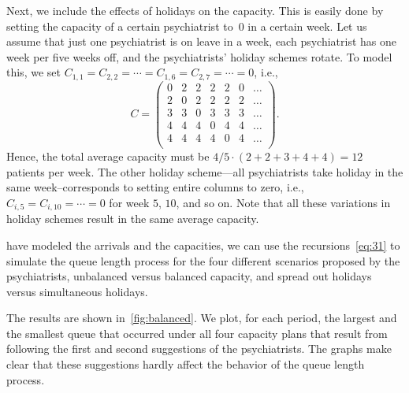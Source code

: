 Next, we include the effects of holidays on the capacity. This is
easily done by setting the capacity of a certain psychiatrist to~$0$ in
a certain week. Let us assume that just one psychiatrist is on leave in
a week, each psychiatrist has one week per five weeks off, and the
psychiatrists' holiday schemes rotate. To model this, we set
$C_{1,1}=C_{2,2}=\cdots=C_{1,6}=C_{2,7} =\cdots = 0$, i.e.,
\begin{equation*}
C = 
 \begin{pmatrix}
 0 & 2 & 2 & 2 & 2 & 0 & \ldots \\
 2 & 0 & 2 & 2 & 2 & 2 & \ldots\\
 3 & 3 & 0 & 3 & 3 & 3 & \ldots\\
 4 & 4 & 4 & 0 & 4 & 4 & \ldots\\
 4 & 4 & 4 & 4 & 0 & 4 & \ldots\\
 \end{pmatrix}.
\end{equation*}
Hence, the total average capacity must be $4/5 \cdot (2+2+3+4+4) = 12$
patients per week. The other holiday scheme---all psychiatrists take
holiday in the same week--corresponds to setting entire columns to
zero, i.e., $C_{i,5}=C_{i,10}=\cdots=0$ for week $5$, $10$, and so
on. Note that all these variations in holiday schemes result in the
same average capacity.

 have modeled the arrivals and the capacities, we can use the recursions~\cref{eq:31} to simulate the queue length process for the four different scenarios proposed by the psychiatrists, unbalanced versus balanced capacity, and spread out holidays versus simultaneous holidays.

The results are shown in~\cref{fig:balanced}.
We plot, for each period, the largest and the smallest queue that occurred under all four capacity plans that result from following the first and second suggestions of the psychiatrists.
The graphs make clear that these suggestions hardly affect the behavior of the queue length process.



